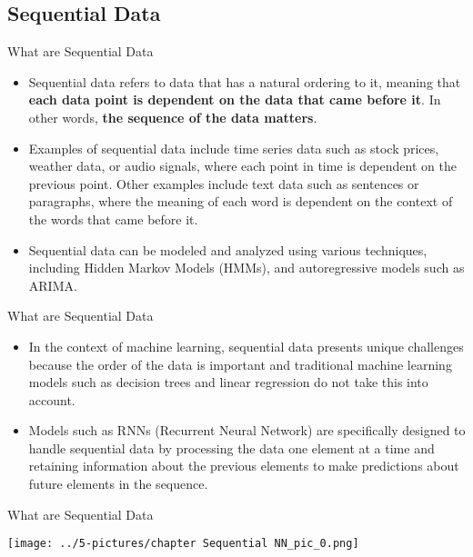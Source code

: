 \documentclass[11pt]{beamer}
\begin{document}
\subsection{Sequential Data \\ \scalebox{0.8}{}}
%
\begin{frame}{What are Sequential Data}
	\begin{itemize}
		\item Sequential data refers to data that has a natural ordering to it, meaning that \textbf{each data point is dependent on the data that came before it}. In other words, \textbf{the sequence of the data matters}.
		\item Examples of sequential data include time series data such as stock prices, weather data, or audio signals, where each point in time is dependent on the previous point. Other examples include text data such as sentences or paragraphs, where the meaning of each word is dependent on the context of the words that came before it.
		\item Sequential data can be modeled and analyzed using various techniques, including Hidden Markov Models (HMMs), and autoregressive models such as ARIMA.
	\end{itemize}
\end{frame}
\begin{frame}{What are Sequential Data}
	\begin{itemize}
		\item In the context of machine learning, sequential data presents unique challenges because the order of the data is important and traditional machine learning models such as decision trees and linear regression do not take this into account. 
		\item Models such as RNNs (Recurrent Neural Network) are specifically designed to handle sequential data by processing the data one element at a time and retaining information about the previous elements to make predictions about future elements in the sequence.
	\end{itemize}
\end{frame}
\begin{frame}{What are Sequential Data}
	\begin{center}
	\texttt{[image: ../5-pictures/chapter Sequential NN\_pic\_0.png]}
	\end{center}
\end{frame}
%
\end{document}
